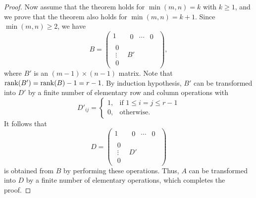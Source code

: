 \begin{proof}
  Now assume that the theorem holds for $\min(m, n) = k$ with $k \geq 1$, and
  we prove that the theorem also holds for $\min(m, n) = k + 1$.
  Since $\min(m, n) \geq 2$, we have
  \begin{equation*}
    B = \left(
      \begin{array}{c|c}
        1 & \begin{array}{ccc} 0 & \cdots & 0 \end{array} \\
        \hline
        \begin{array}{c} 0 \\ \vdots \\ 0 \end{array} & B'
      \end{array}
    \right),
  \end{equation*}
  where $B'$ is an $(m-1) \times (n-1)$ matrix.
  Note that $\operatorname{rank}(B') = \operatorname{rank}(B) - 1 = r - 1$.
  By induction hypothesis, $B'$ can be transformed into $D'$ by a finite number
  of elementary row and column operations with
  \begin{equation*}
    D'_{ij} =
    \begin{cases}
      1, & \text{if $1 \leq i = j \leq r - 1$} \\
      0, & \text{otherwise}.
    \end{cases}
  \end{equation*}
  It follows that
  \begin{equation*}
    D = \left(
      \begin{array}{c|c}
        1 & \begin{array}{ccc} 0 & \cdots & 0 \end{array} \\
        \hline
        \begin{array}{c} 0 \\ \vdots \\ 0 \end{array} & D'
      \end{array}
    \right)
  \end{equation*}
  is obtained from $B$ by performing these operations.
  Thus, $A$ can be transformed into $D$ by a finite number of
  elementary operations, which completes the proof.
\end{proof}

